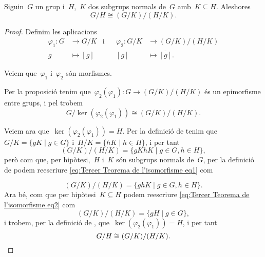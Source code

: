 \documentclass[../../main.tex]{subfiles}
\begin{document}
    \begin{theorem}
        \label{thm:Tercer Teorema de l'isomorfisme entre grups}
        Siguin~\(G\) un grup i~\(H\),~\(K\) dos subgrups normals de~\(G\) amb~\(K\subseteq H\).
        Aleshores
        \[
            G/H\cong (G/K)/(H/K).
        \]
        \begin{proof}
            Definim les aplicacions
            \begin{align*}
            \varphi_{1}\colon G&\longrightarrow G/K&\text{i}&&\varphi_{2}\colon G/K&\longrightarrow(G/K)/(H/K)\\
            g&\longmapsto[g]&&&[g]&\longmapsto\overline{[g]}.
            \end{align*}

            Veiem que~\(\varphi_{1}\) i~\(\varphi_{2}\) són morfismes.

            Per la proposició  tenim que~\(\varphi_{2}(\varphi_{1})\colon G\longrightarrow(G/K)/(H/K)\) és un epimorfisme entre grups, %
            i pel  trobem
            \[
                G/\ker(\varphi_{2}(\varphi_{1}))\cong(G/K)/(H/K).
            \]

            Veiem ara que~\(\ker(\varphi_{2}(\varphi_{1}))=H\).
            Per la definició de  tenim que~\(G/K=\{gK\mid g\in G\}\) i~\(H/K=\{hK\mid h\in H\}\), i per tant
            \begin{equation}
            \label{eq:Tercer Teorema de l'isomorfisme eq1}
            (G/K)/(H/K)=\{gKhK\mid g\in G, h\in H\},
            \end{equation}
            però com que, per hipòtesi,~\(H\) i~\(K\) són subgrups normals de~\(G\), per la definició de  podem reescriure \eqref{eq:Tercer Teorema de l'isomorfisme eq1} com

            \begin{equation}\label{eq:Tercer Teorema de l'isomorfisme eq2}
            (G/K)/(H/K)=\{ghK\mid g\in G,h\in H\}.
            \end{equation}
            Ara bé, com que per hipòtesi~\(K\subseteq H\) podem reescriure \eqref{eq:Tercer Teorema de l'isomorfisme eq2} com
            \[
                (G/K)/(H/K)=\{gH\mid g\in G\},
            \]
            i trobem, per la definició de , que~\(\ker(\varphi_{2}(\varphi_{1}))=H\), i per tant
            \[
                G/H\cong (G/K)/(H/K).\qedhere
            \]
        \end{proof}
    \end{theorem}
\end{document}
